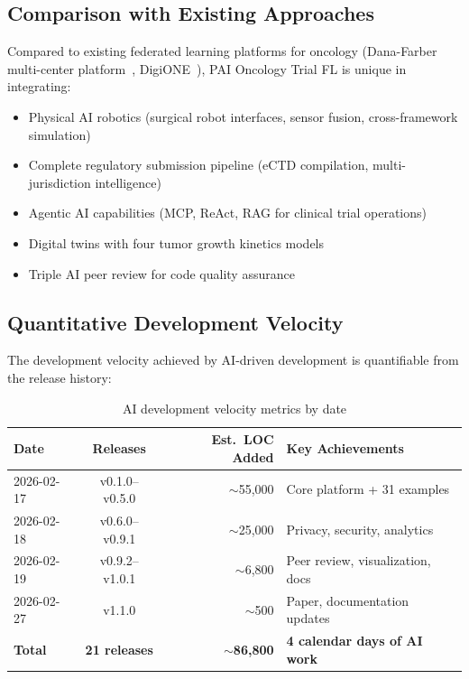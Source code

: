 \documentclass[10pt]{article}
\begin{document}
\subsection{Comparison with Existing Approaches}

Compared to existing federated learning platforms for oncology (Dana-Farber multi-center platform~\cite{danafarberfederated2025}, DigiONE~\cite{digione2024}), PAI Oncology Trial FL is unique in integrating:
\begin{itemize}
  \item Physical AI robotics (surgical robot interfaces, sensor fusion, cross-framework simulation)
  \item Complete regulatory submission pipeline (eCTD compilation, multi-jurisdiction intelligence)
  \item Agentic AI capabilities (MCP, ReAct, RAG for clinical trial operations)
  \item Digital twins with four tumor growth kinetics models
  \item Triple AI peer review for code quality assurance
\end{itemize}

\subsection{Quantitative Development Velocity}

The development velocity achieved by AI-driven development is quantifiable from the release history:

\begin{table}[H]
\centering
\caption{AI development velocity metrics by date}
\label{tab:velocity}
\small
\begin{tabular}{@{}lcrl@{}}
\toprule
\textbf{Date} & \textbf{Releases} & \textbf{Est.\ LOC Added} & \textbf{Key Achievements} \\
\midrule
2026-02-17 & v0.1.0--v0.5.0 & $\sim$55,000 & Core platform + 31 examples \\
2026-02-18 & v0.6.0--v0.9.1 & $\sim$25,000 & Privacy, security, analytics \\
2026-02-19 & v0.9.2--v1.0.1 & $\sim$6,800 & Peer review, visualization, docs \\
2026-02-27 & v1.1.0 & $\sim$500 & Paper, documentation updates \\
\midrule
\textbf{Total} & \textbf{21 releases} & $\sim$\textbf{86,800} & \textbf{4 calendar days of AI work} \\
\bottomrule
\end{tabular}
\end{table}
\end{document}
